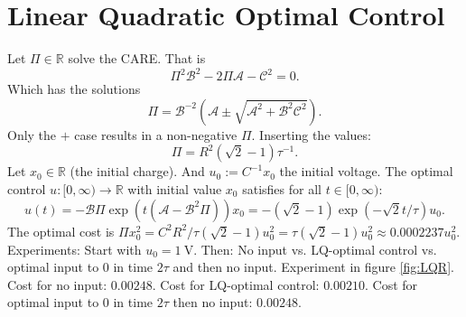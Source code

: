 \documentclass[10pt, a4paper]{article} %
\begin{document}
\section{Linear Quadratic Optimal Control}
Let $\Pi \in \mathbb{R}$ solve the CARE.
That is
\begin{equation*}
	\Pi^2 \mathcal{B}^2 - 2 \Pi \mathcal{A} - \mathcal{C}^2 =0.
\end{equation*}
Which has the solutions
\begin{equation*}
	\Pi = \mathcal{B}^{-2} ( \mathcal{A} \pm \sqrt{\mathcal{A}^2  + \mathcal{B}^2 \mathcal{C}^2 }).
\end{equation*}
Only the $+$ case results in a non-negative $\Pi$.
Inserting the values:
\begin{equation*}
	\Pi = R^2( \sqrt{2}-1) \tau^{-1}.
\end{equation*}
Let $x_0 \in \mathbb{R}$ (the initial charge).
And $ u_0 :=  C^{-1} x_0$ the initial voltage.
The optimal control $u:[0, \infty) \to \mathbb{R}$ with initial value $x_0$ satisfies for all $t\in [0,\infty)$:
\begin{equation*}
	u (t) = - \mathcal{B} \Pi \exp ( t (\mathcal{A}- \mathcal{B}^2 \Pi)) x_0 = - (\sqrt{2}-1) \exp( - \sqrt{2} t /\tau) u_0.
\end{equation*}
The optimal cost is $\Pi x_0^2 = C^2 R^2 / \tau (\sqrt{2}-1) u_0^2 = \tau (\sqrt{2}-1) u_0^2 \approx 0.0002237 u_0^2$.
Experiments: Start with $u_0= \SI{1}{\volt}$. Then: No input vs. LQ-optimal control vs. optimal input to $0$ in time $2\tau$ and then no input.
Experiment in figure \ref{fig:LQR}.
Cost for no input: $0.00248$.
Cost for LQ-optimal control: $0.00210$.
Cost for optimal input to $0$ in time $2\tau$ then no input: $0.00248$.
\end{document}
